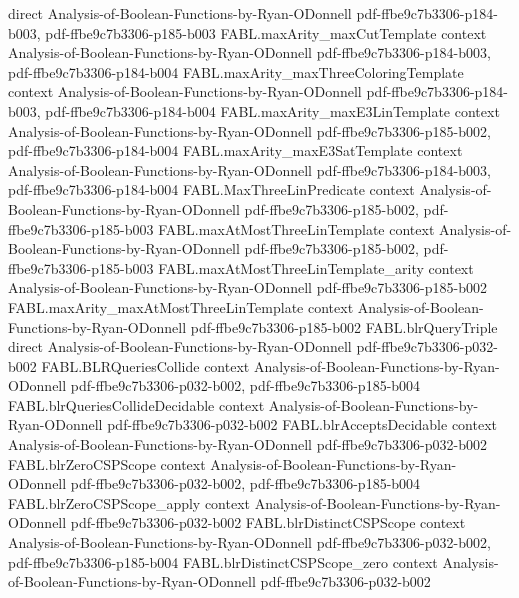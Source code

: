 \begin{theorem}
  {direct}
  {Analysis-of-Boolean-Functions-by-Ryan-ODonnell}
  {pdf-ffbe9c7b3306-p184-b003,
    pdf-ffbe9c7b3306-p185-b003}
\proofstep
  {FABL.maxArity_maxCutTemplate}
  {context}
  {Analysis-of-Boolean-Functions-by-Ryan-ODonnell}
  {pdf-ffbe9c7b3306-p184-b003,
    pdf-ffbe9c7b3306-p184-b004}
\proofstep
  {FABL.maxArity_maxThreeColoringTemplate}
  {context}
  {Analysis-of-Boolean-Functions-by-Ryan-ODonnell}
  {pdf-ffbe9c7b3306-p184-b003,
    pdf-ffbe9c7b3306-p184-b004}
\proofstep
  {FABL.maxArity_maxE3LinTemplate}
  {context}
  {Analysis-of-Boolean-Functions-by-Ryan-ODonnell}
  {pdf-ffbe9c7b3306-p185-b002,
    pdf-ffbe9c7b3306-p184-b004}
\proofstep
  {FABL.maxArity_maxE3SatTemplate}
  {context}
  {Analysis-of-Boolean-Functions-by-Ryan-ODonnell}
  {pdf-ffbe9c7b3306-p184-b003,
    pdf-ffbe9c7b3306-p184-b004}
\proofstep
  {FABL.MaxThreeLinPredicate}
  {context}
  {Analysis-of-Boolean-Functions-by-Ryan-ODonnell}
  {pdf-ffbe9c7b3306-p185-b002,
    pdf-ffbe9c7b3306-p185-b003}
\proofstep
  {FABL.maxAtMostThreeLinTemplate}
  {context}
  {Analysis-of-Boolean-Functions-by-Ryan-ODonnell}
  {pdf-ffbe9c7b3306-p185-b002,
    pdf-ffbe9c7b3306-p185-b003}
\proofstep
  {FABL.maxAtMostThreeLinTemplate_arity}
  {context}
  {Analysis-of-Boolean-Functions-by-Ryan-ODonnell}
  {pdf-ffbe9c7b3306-p185-b002}
\proofstep
  {FABL.maxArity_maxAtMostThreeLinTemplate}
  {context}
  {Analysis-of-Boolean-Functions-by-Ryan-ODonnell}
  {pdf-ffbe9c7b3306-p185-b002}
\proofstep
  {FABL.blrQueryTriple}
  {direct}
  {Analysis-of-Boolean-Functions-by-Ryan-ODonnell}
  {pdf-ffbe9c7b3306-p032-b002}
\proofstep
  {FABL.BLRQueriesCollide}
  {context}
  {Analysis-of-Boolean-Functions-by-Ryan-ODonnell}
  {pdf-ffbe9c7b3306-p032-b002,
    pdf-ffbe9c7b3306-p185-b004}
\proofstep
  {FABL.blrQueriesCollideDecidable}
  {context}
  {Analysis-of-Boolean-Functions-by-Ryan-ODonnell}
  {pdf-ffbe9c7b3306-p032-b002}
\proofstep
  {FABL.blrAcceptsDecidable}
  {context}
  {Analysis-of-Boolean-Functions-by-Ryan-ODonnell}
  {pdf-ffbe9c7b3306-p032-b002}
\proofstep
  {FABL.blrZeroCSPScope}
  {context}
  {Analysis-of-Boolean-Functions-by-Ryan-ODonnell}
  {pdf-ffbe9c7b3306-p032-b002,
    pdf-ffbe9c7b3306-p185-b004}
\proofstep
  {FABL.blrZeroCSPScope_apply}
  {context}
  {Analysis-of-Boolean-Functions-by-Ryan-ODonnell}
  {pdf-ffbe9c7b3306-p032-b002}
\proofstep
  {FABL.blrDistinctCSPScope}
  {context}
  {Analysis-of-Boolean-Functions-by-Ryan-ODonnell}
  {pdf-ffbe9c7b3306-p032-b002,
    pdf-ffbe9c7b3306-p185-b004}
\proofstep
  {FABL.blrDistinctCSPScope_zero}
  {context}
  {Analysis-of-Boolean-Functions-by-Ryan-ODonnell}
  {pdf-ffbe9c7b3306-p032-b002}

\end{theorem}
